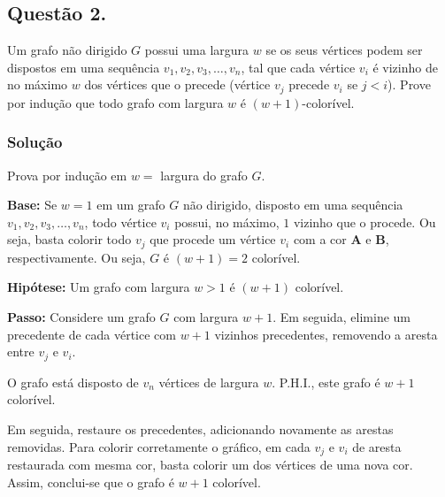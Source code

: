 \documentclass[12pt, letterpaper]{report}
\newcounter{ProblemNum}
\newcommand*{\anyproblem}[1]{\newpage\subsection*{#1}}
\newcommand*{\problem}[1]{\stepcounter{ProblemNum} %
   \anyproblem{Questão #1}}
\newcommand*{\soln}[1]{\subsubsection*{#1}}
\newcommand*{\solution}{\soln{Solução}}
\begin{document}
\problem{2.}
  Um grafo não dirigido $ G $ possui uma largura $ w $ se os seus vértices podem ser dispostos em uma sequência $ v_1, v_2, v_3, \dots, v_n $, tal que cada vértice $ v_i $ é vizinho de no máximo $ w $ dos vértices que o precede (vértice $ v_j $ precede $ v_i $ se $ j < i $). Prove por indução que todo grafo com largura $ w $ é $ (w + 1) $-colorível.

\solution
  Prova por indução em $w =$ largura do grafo $G$.

  \textbf{Base:} Se $w = 1$ em um grafo $G$ não dirigido, disposto em uma sequência $v_1, v_2, v_3, \dots, v_n$, todo vértice $v_i$ possui, no máximo, $1$ vizinho que o procede. Ou seja, basta colorir todo $v_j$ que procede um vértice $v_i$ com a cor \textbf{A} e \textbf{B}, respectivamente. Ou seja, $G$ é $ (w + 1) = 2$ colorível.

  \textbf{Hipótese:} Um grafo com largura $w > 1$ é $(w + 1)$ colorível.

  \textbf{Passo:} Considere um grafo $G$ com largura $w + 1$. Em seguida, elimine um precedente de cada vértice com $w + 1$ vizinhos precedentes, removendo a aresta entre $v_j$ e $v_i$.

  O grafo está disposto de $v_n$ vértices de largura $w$. P.H.I., este grafo é $w + 1$ colorível.

  Em seguida, restaure os precedentes, adicionando novamente as arestas removidas. Para colorir corretamente o gráfico, em cada $v_j$ e $v_i$ de aresta restaurada com mesma cor, basta colorir um dos vértices de uma nova cor. Assim, conclui-se que o grafo é $w + 1$ colorível.
\end{document}
